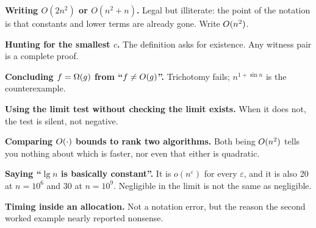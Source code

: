 \begin{pitfall}
\begin{tight}
  \item \textbf{Writing $O(2n^{2})$ or $O(n^{2} + n)$.} Legal but illiterate:
        the point of the notation is that constants and lower terms are already
        gone. Write $O(n^{2})$.
  \item \textbf{Hunting for the smallest $c$.} The definition asks for
        existence. Any witness pair is a complete proof.
  \item \textbf{Concluding $f = \Omega(g)$ from ``$f \ne O(g)$''.}
        Trichotomy fails; $n^{1+\sin n}$ is the counterexample.
  \item \textbf{Using the limit test without checking the limit exists.}
        When it does not, the test is silent, not negative.
  \item \textbf{Comparing $O(\cdot)$ bounds to rank two algorithms.} Both
        being $O(n^{2})$ tells you nothing about which is faster, nor even
        that either is quadratic.
  \item \textbf{Saying ``$\lg n$ is basically constant''.} It is $o(n^{\varepsilon})$
        for every $\varepsilon$, and it is also 20 at $n = 10^{6}$ and 30 at
        $n = 10^{9}$. Negligible in the limit is not the same as negligible.
  \item \textbf{Timing inside an allocation.} Not a notation error, but the
        reason the second worked example nearly reported nonsense.
\end{tight}
\end{pitfall}

